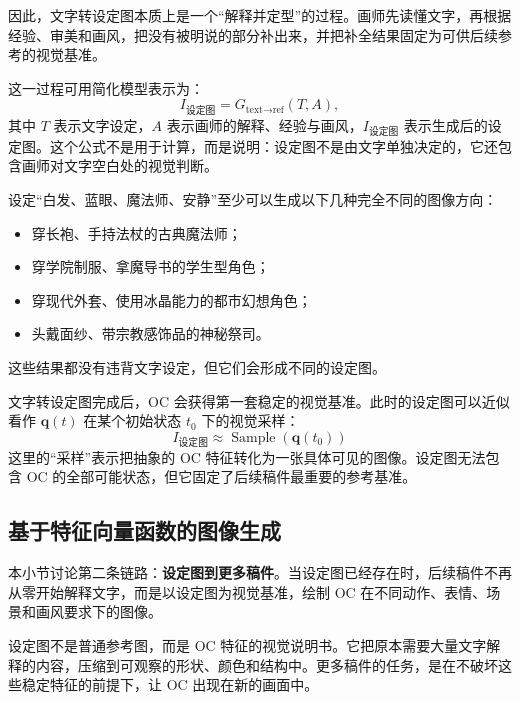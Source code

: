 因此，文字转设定图本质上是一个“解释并定型”的过程。画师先读懂文字，再根据经验、审美和画风，把没有被明说的部分补出来，并把补全结果固定为可供后续参考的视觉基准。

这一过程可用简化模型表示为：
\begin{equation}
    I_{\text{设定图}}=G_{\text{text}\to\text{ref}}(T,A),
\end{equation}
其中 $T$ 表示文字设定，$A$ 表示画师的解释、经验与画风，$I_{\text{设定图}}$ 表示生成后的设定图。这个公式不是用于计算，而是说明：设定图不是由文字单独决定的，它还包含画师对文字空白处的视觉判断。

\begin{example}[文字设定的多解性]
    设定“白发、蓝眼、魔法师、安静”至少可以生成以下几种完全不同的图像方向：
    \begin{itemize}
        \item 穿长袍、手持法杖的古典魔法师；
        \item 穿学院制服、拿魔导书的学生型角色；
        \item 穿现代外套、使用冰晶能力的都市幻想角色；
        \item 头戴面纱、带宗教感饰品的神秘祭司。
    \end{itemize}
    这些结果都没有违背文字设定，但它们会形成不同的设定图。
\end{example}

文字转设定图完成后，OC 会获得第一套稳定的视觉基准。此时的设定图可以近似看作 $\mathbf{q}(t)$ 在某个初始状态 $t_0$ 下的视觉采样：
\begin{equation}
    I_{\text{设定图}}\approx \operatorname{Sample}(\mathbf{q}(t_0))
\end{equation}
这里的“采样”表示把抽象的 OC 特征转化为一张具体可见的图像。设定图无法包含 OC 的全部可能状态，但它固定了后续稿件最重要的参考基准。

\subsection{基于特征向量函数的图像生成}\label{subsec:feature_based_gen}

本小节讨论第二条链路：\textbf{设定图到更多稿件}。当设定图已经存在时，后续稿件不再从零开始解释文字，而是以设定图为视觉基准，绘制 OC 在不同动作、表情、场景和画风要求下的图像。

设定图不是普通参考图，而是 OC 特征的视觉说明书。它把原本需要大量文字解释的内容，压缩到可观察的形状、颜色和结构中。更多稿件的任务，是在不破坏这些稳定特征的前提下，让 OC 出现在新的画面中。

